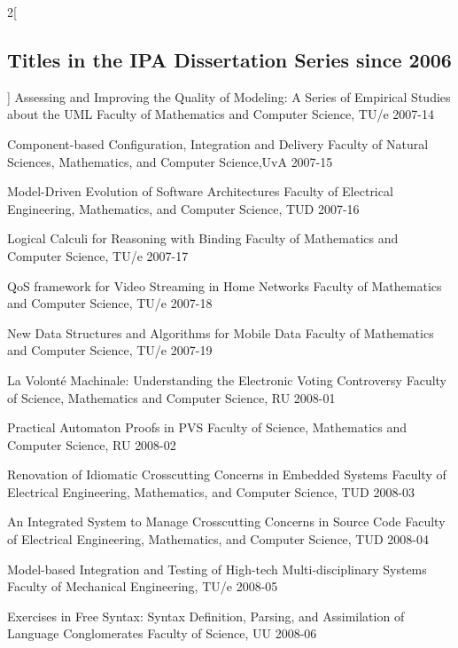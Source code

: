 \begin{multicols}{2}[\subsection*{Titles in the IPA Dissertation Series since 2006}]
         {Assessing and Improving the Quality of Modeling: A Series of Empirical Studies about the UML}
         {Faculty of Mathematics and Computer Science, TU/e}
         {2007-14}

         {Component-based Configuration, Integration and Delivery}
         {Faculty of Natural Sciences, Mathematics, and Computer Science,UvA}
         {2007-15}

         {Model-Driven Evolution of Software Architectures}
         {Faculty of Electrical Engineering, Mathematics, and Computer Science, TUD}
         {2007-16}

         {Logical Calculi for Reasoning with Binding}
         {Faculty of Mathematics and Computer Science, TU/e}
         {2007-17}

         {QoS framework for Video Streaming in Home Networks}
         {Faculty of Mathematics and Computer Science, TU/e}
         {2007-18}

         {New Data Structures and Algorithms for Mobile Data}
         {Faculty of Mathematics and Computer Science, TU/e}
         {2007-19}

         {La Volont\'{e} Machinale: Understanding the Electronic Voting Controversy}
         {Faculty of Science, Mathematics and Computer Science, RU}
         {2008-01}

         {Practical Automaton Proofs in PVS}
         {Faculty of Science, Mathematics and Computer Science, RU}
         {2008-02}

         {Renovation of Idiomatic Crosscutting Concerns in Embedded Systems}
         {Faculty of Electrical Engineering, Mathematics, and Computer Science, TUD}
         {2008-03}

         {An Integrated System to Manage Crosscutting Concerns in Source Code}
         {Faculty of Electrical Engineering, Mathematics, and Computer Science, TUD}
         {2008-04}

         {Model-based Integration and Testing of High-tech Multi-disciplinary Systems}
         {Faculty of Mechanical Engineering, TU/e}
         {2008-05}

         {Exercises in Free Syntax: Syntax Definition, Parsing, and Assimilation of Language Conglomerates}
         {Faculty of Science, UU}
         {2008-06}


\end{multicols}
